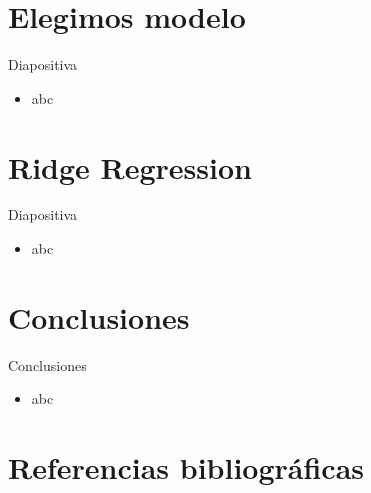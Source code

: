 \documentclass[11pt]{beamer}
\begin{document}
\section{Elegimos modelo}

\begin{frame}{Diapositiva}
	\begin{itemize}
		\item abc
	\end{itemize}
\end{frame}


\section{Ridge Regression}

\begin{frame}{Diapositiva}
	\begin{itemize}
		\item abc
	\end{itemize}
\end{frame}


\section{Conclusiones}

\begin{frame}{Conclusiones}
	\begin{itemize}
		\item abc
	\end{itemize}
\end{frame}


\section{Referencias bibliográficas}
\end{document}
